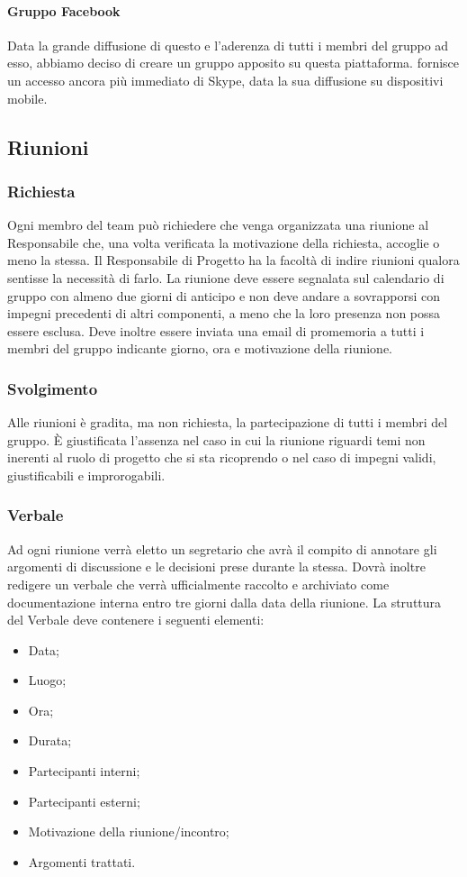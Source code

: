 \paragraph{Gruppo Facebook \\}
Data la grande diffusione di questo  e l'aderenza di tutti i membri del gruppo ad esso, abbiamo deciso di creare un gruppo apposito su questa piattaforma.  fornisce un accesso ancora più immediato di Skype, data la sua diffusione su dispositivi mobile.  

\subsection{Riunioni}
\label{3.3}

\subsubsection{Richiesta}
\label{3.3.1}
Ogni membro del team può richiedere che venga organizzata una riunione al Responsabile che, una volta verificata la motivazione della richiesta, accoglie o meno la stessa.
Il Responsabile di Progetto ha la facoltà di indire riunioni qualora sentisse la necessità di farlo.
La riunione deve essere segnalata sul calendario di gruppo con almeno due giorni di anticipo e non deve andare a sovrapporsi con impegni precedenti di altri componenti, a meno che la loro presenza non possa essere esclusa. Deve inoltre essere inviata una email di promemoria a tutti i membri del gruppo indicante giorno, ora e motivazione della riunione.

\subsubsection{Svolgimento}
\label{3.3.2}
Alle riunioni è gradita, ma non richiesta, la partecipazione di tutti i membri del gruppo. È giustificata l'assenza nel caso in cui la riunione riguardi temi non inerenti al ruolo di progetto che si sta ricoprendo o nel caso di impegni validi, giustificabili e improrogabili.

\subsubsection{Verbale}
\label{3.3.3}
Ad ogni riunione verrà eletto un segretario che avrà il compito di annotare gli argomenti di discussione e le decisioni prese durante la stessa.
Dovrà inoltre redigere un verbale che verrà ufficialmente raccolto e archiviato come documentazione interna entro tre giorni dalla data della riunione.
La struttura del Verbale deve contenere i seguenti elementi:
\begin{itemize}
\item Data;
\item Luogo;
\item Ora;
\item Durata;
\item Partecipanti interni;
\item Partecipanti esterni;
\item Motivazione della riunione/incontro;
\item Argomenti trattati.
\end{itemize}

